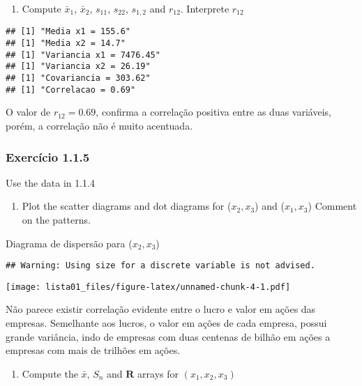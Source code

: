 \documentclass[
]{article}
\providecommand{\tightlist}{%
  \setlength{\itemsep}{0pt}\setlength{\parskip}{0pt}}
\begin{document}
\begin{enumerate}
\def\labelenumi{\alph{enumi})}
\setcounter{enumi}{1}
\tightlist
\item
  Compute \(\bar{x}_{1}\), \(\bar{x}_{2}\), \(s_{11}\), \(s_{22}\),
  \(s_{1,2}\) and \(r_{12}\). Interprete \(r_{12}\)
\end{enumerate}

\begin{verbatim}
## [1] "Media x1 = 155.6"
## [1] "Media x2 = 14.7"
## [1] "Variancia x1 = 7476.45"
## [1] "Variancia x2 = 26.19"
## [1] "Covariancia = 303.62"
## [1] "Correlacao = 0.69"
\end{verbatim}

O valor de \(r_{12} = 0.69\), confirma a correlação positiva entre as
duas variáveis, porém, a correlação não é muito acentuada.

\hypertarget{exercuxedcio-1.1.5}{%
\subsubsection{Exercício 1.1.5}\label{exercuxedcio-1.1.5}}

Use the data in 1.1.4

\begin{enumerate}
\def\labelenumi{\alph{enumi})}
\tightlist
\item
  Plot the scatter diagrams and dot diagrams for (\(x_{2}, x_{3}\)) and
  (\(x_{1}, x_{3}\)) Comment on the patterns.
\end{enumerate}

Diagrama de dispersão para (\(x_{2}, x_{3}\))

\begin{verbatim}
## Warning: Using size for a discrete variable is not advised.
\end{verbatim}

\texttt{[image: lista01\_files/figure-latex/unnamed-chunk-4-1.pdf]}

Não parece existir correlação evidente entre o lucro e valor em ações
das empresas. Semelhante aos lucros, o valor em ações de cada empresa,
possui grande variância, indo de empresas com duas centenas de bilhão em
ações a empresas com mais de trilhões em ações.

\begin{enumerate}
\def\labelenumi{\alph{enumi})}
\setcounter{enumi}{1}
\tightlist
\item
  Compute the \(\bar{x}\), \(S_{n}\) and \(\textbf{R}\) arrays for
  \((x_{1}, x_{2}, x_{3})\)
\end{enumerate}
\end{document}
